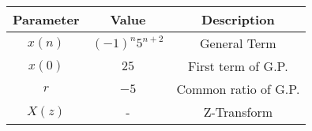 \begin{tabular}{|c|c|c|}
    \hline
     \textbf{Parameter} & \textbf{Value} &
     \textbf{Description}\\
    \hline 
     $x(n)$ &  $(-1)^{n}5^{n+2}$ & General Term\\
    \hline 
     $x(0)$ &  $25$ & First term of G.P.\\
     
    \hline
     $r$ & $-5$ & Common ratio of G.P.  \\
      \hline
      $X(z)$ & - & Z-Transform \\
      \hline
    
  
								      
\end{tabular}
